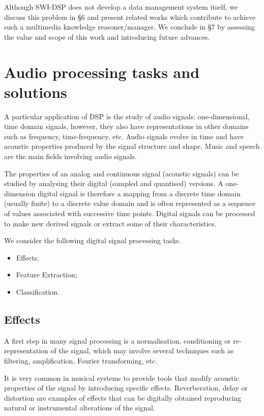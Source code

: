 \documentclass[runningheads]{llncs}
\begin{document}
Although SWI-DSP does not develop a data management system itself, we discuss this problem in \S 6 and present related works which contribute to achieve such a multimedia knowledge reasoner/manager. We conclude in \S 7 by assessing the value and scope of this work and introducing future advances.

\section{Audio processing tasks and solutions}\label{sec:tasks}

A particular application of DSP is the study of audio signals: one-dimensional, time domain signals, however, they also have representations in other domains such as frequency, time-frequency, etc. Audio signals evolve in time and have acoustic properties produced by the signal structure and shape. Music and speech are the main fields involving audio signals.

The properties of an analog and continuous signal (acoustic signals) can be studied by analysing their digital (sampled and quantised) versions. A one-dimension digital signal is therefore a mapping from a discrete time domain (usually finite) to a discrete value domain and is often represented as a sequence of values associated with successive time points. Digital signals can be processed to make new derived signals or extract some of their characteristics.

We consider the following digital signal processing tasks.

\begin{itemize}
 \item Effects;
 \item Feature Extraction;
 \item Classification.
\end{itemize}

\subsection{Effects}\label{subsec:effects}
A first step in many signal processing is a normalisation, conditioning or re-representation of the signal, which may involve several techniques such as filtering, amplification, Fourier transforming, etc.

It is very common in musical systems to provide tools that modify acoustic properties of the signal by introducing specific effects. Reverberation, delay or distortion are examples of effects that can be digitally obtained reproducing natural or instrumental alterations of the signal.
\end{document}
